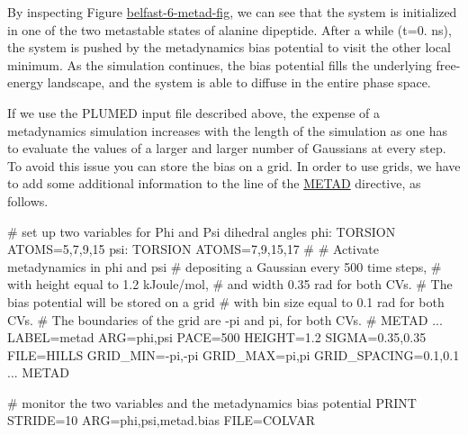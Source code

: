 \label{belfast-6_belfast-6-metad-fig}%
\hypertarget{belfast-6_belfast-6-metad-fig}{}%
 By inspecting Figure \hyperlink{belfast-6_belfast-6-metad-fig}{belfast-\/6-\/metad-\/fig}, we can see that the system is initialized in one of the two metastable states of alanine dipeptide. After a while (t=0. ns), the system is pushed by the metadynamics bias potential to visit the other local minimum. As the simulation continues, the bias potential fills the underlying free-\/energy landscape, and the system is able to diffuse in the entire phase space.

If we use the P\+L\+U\+M\+E\+D input file described above, the expense of a metadynamics simulation increases with the length of the simulation as one has to evaluate the values of a larger and larger number of Gaussians at every step. To avoid this issue you can store the bias on a grid. In order to use grids, we have to add some additional information to the line of the \hyperlink{METAD}{M\+E\+T\+A\+D} directive, as follows.

\begin{DoxyVerb}# set up two variables for Phi and Psi dihedral angles
phi: TORSION ATOMS=5,7,9,15
psi: TORSION ATOMS=7,9,15,17
#
# Activate metadynamics in phi and psi
# depositing a Gaussian every 500 time steps,
# with height equal to 1.2 kJoule/mol,
# and width 0.35 rad for both CVs.
# The bias potential will be stored on a grid
# with bin size equal to 0.1 rad for both CVs. 
# The boundaries of the grid are -pi and pi, for both CVs.
#
METAD ...
LABEL=metad
ARG=phi,psi 
PACE=500
HEIGHT=1.2
SIGMA=0.35,0.35
FILE=HILLS
GRID_MIN=-pi,-pi
GRID_MAX=pi,pi
GRID_SPACING=0.1,0.1 
... METAD

# monitor the two variables and the metadynamics bias potential
PRINT STRIDE=10 ARG=phi,psi,metad.bias FILE=COLVAR\end{DoxyVerb}


